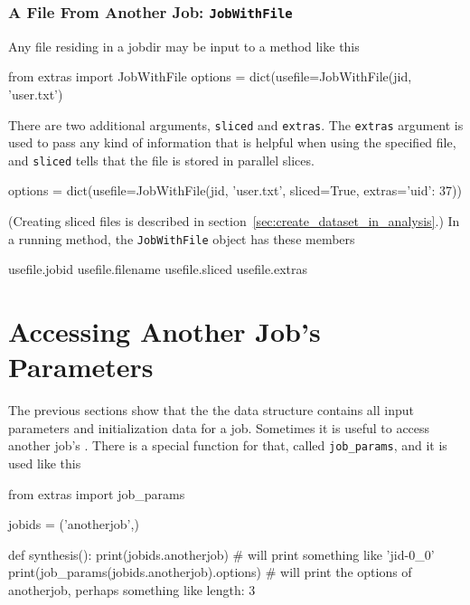 \subsubsection*{A File From Another Job:  \texttt{JobWithFile}}

Any file residing in a jobdir may be input to a method like this
\begin{python}
from extras import JobWithFile
options = dict(usefile=JobWithFile(jid, 'user.txt')
\end{python}
There are two additional arguments, \texttt{sliced} and
\texttt{extras}.  The \texttt{extras} argument is used to pass any
kind of information that is helpful when using the specified file, and
\texttt{sliced} tells that the file is stored in parallel slices.
\begin{python}
options = dict(usefile=JobWithFile(jid, 'user.txt', sliced=True, extras={'uid': 37}))
\end{python}
(Creating sliced files is described in section~\ref{sec:create_dataset_in_analysis}.)  In a
running method, the \texttt{JobWithFile} object has these members
\begin{python}
usefile.jobid
usefile.filename
usefile.sliced
usefile.extras
\end{python}



\section{Accessing Another Job's Parameters}

The previous sections show that the the \params data structure
contains all input parameters and initialization data for a job.
Sometimes it is useful to access another job's \params.  There is a
special function for that, called \texttt{job\_params}, and it is used
like this
\begin{python}
from extras import job_params

jobids = ('anotherjob',)

def synthesis():
    print(jobids.anotherjob)
    # will print something like 'jid-0_0'
    print(job_params(jobids.anotherjob).options)
    # will print the options of anotherjob, perhaps something like {length: 3}
\end{python}




